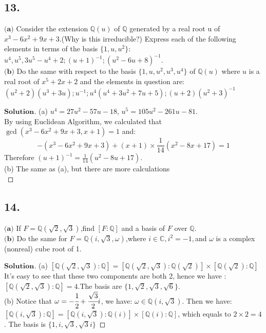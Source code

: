 \documentclass[a4paper, 11pt]{article}
\newenvironment{solution}
{\renewcommand\qedsymbol{$ $}\begin{proof}[$\textbf{Solution}$]}
  {\end{proof}}
\begin{document}
 \subsection*{13.}
 $\textbf{(a)}$ Consider the extension $\mathbb{Q}(u)$ of $\mathbb{Q}$ generated by a real root u
 of $x^3-6x^2+9x+3$.(Why is this irreducible?) Express each of the following elements
 in terms of the basis $\{1,u,u^2\}$:$u^4, u^5, 3u^5-u^4+2;(u+1)^{-1};(u^2-6u+8)^{-1}.$\\
 $\textbf{(b)}$ Do the same with respect to the basis $\{1,u,u^2,u^3,u^4\}$ of $\mathbb{Q}(u)$ where
 $u$ is a real root of $x^{5}+2x+2$ and the elements in question are: 
 $(u^2+2)(u^3+3u);u^{-1};u^{4}(u^{4}+3u^{2}+7u+5);(u+2)(u^2+3)^{-1}$
 
 \begin{solution}
         (a) $u^4=27u^2-57u-18$, $u^5=105u^2-261u-81$.\\
         By using Euclidean Algorithm, we calculated that $\gcd(x^3-6x^2+9x+3,x+1)=1$ and:
         $$
         -(x^3-6x^2+9x+3)+(x+1)\times\frac{1}{14}(x^2-8x+17)=1
         $$ Therefore $(u+1)^{-1}=\frac{1}{14}(u^2-8u+17)$.\\
         (b) The same as (a), but there are more calculations\\
 \end{solution}

 \subsection*{14.}
 $\textbf{(a)}$ If $F=\mathbb{Q}(\sqrt{2}, \sqrt{3})$,find $[F:\mathbb{Q}]$ and a basis of $F$ over $\mathbb{Q}$.\\
 $\textbf{(b)}$ Do the same for $F=\mathbb{Q}(i,\sqrt{3}, \omega)$,where $i\in \mathbb{C}, i^2=-1,$and $\omega$
 is a complex (nonreal) cube root of 1.

 \begin{solution}
         (a) $[\mathbb{Q}(\sqrt{2}, \sqrt{3}):\mathbb{Q}]=[\mathbb{Q}(\sqrt{2},\sqrt{3}):\mathbb{Q}(\sqrt{2})]
         \times [\mathbb{Q}(\sqrt{2}):\mathbb{Q}]$ It's easy to see that these two components are both 2, hence 
         we have : $[\mathbb{Q}(\sqrt{2}, \sqrt{3}):\mathbb{Q}]=4$.The basis are $\{1,\sqrt{2}, \sqrt{3},\sqrt{6} \}$.\\
         (b) Notice that $\omega=-\cfrac{1}{2}+\cfrac{\sqrt{3}}{2}i$, we have: $\omega\in \mathbb{Q}(i,\sqrt{3})$.
         Then we have:$[\mathbb{Q}(i,\sqrt{3}):\mathbb{Q}]=[\mathbb{Q}(i,\sqrt{3}):\mathbb{Q}(i)]\times 
         [\mathbb{Q}(i):\mathbb{Q}]$, which equals to $2\times2=4$. The basis is $\{1, i,\sqrt{3}, \sqrt{3}i\}$

 \end{solution}
\end{document}

